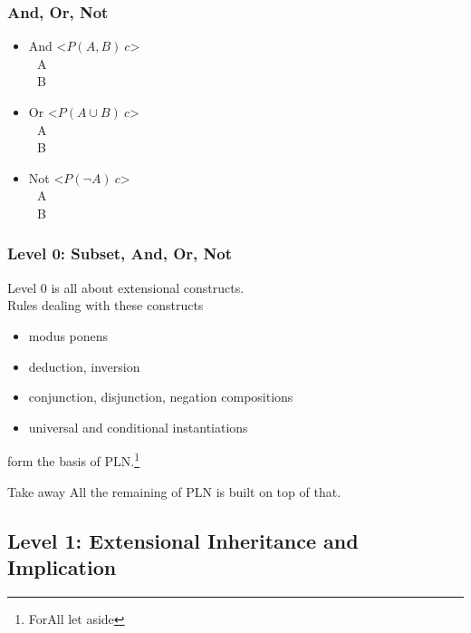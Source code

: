 \documentclass{beamer}
\begin{document}
\frame
{
  \frametitle{And, Or, Not}

  \begin{itemize}
    \item 
        And <$P(A, B)\ c$>\\
        $\ \ \ $A\\
        $\ \ \ $B\\[.5cm]
    \item 
      Or <$P(A \cup B)\ c$>\\
      $\ \ \ $A\\
      $\ \ \ $B\\[.5cm]
    \item 
      Not <$P(\lnot A)\ c$>\\
      $\ \ \ $A\\
      $\ \ \ $B\\
  \end{itemize}
}

\frame
{
  \frametitle{Level 0: Subset, And, Or, Not}

  Level 0 is all about \alert{extensional} constructs.\\[.25cm]
  
  Rules dealing with these constructs
  \begin{itemize}
    \item modus ponens
    \item deduction, inversion
    \item conjunction, disjunction, negation compositions
    \item universal and conditional instantiations
  \end{itemize}
  form the \alert{basis of PLN}.\footnote{ForAll let aside}\\[.25cm]

  \pause

  \begin{beamerboxesrounded}{Take away}
    All the remaining of PLN is built on top of that.
  \end{beamerboxesrounded}

}

\subsection{Level 1: Extensional Inheritance and Implication}
\end{document}

